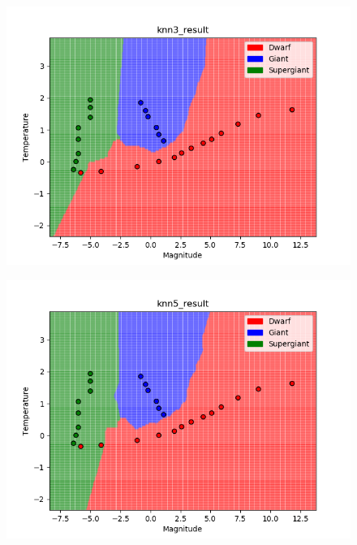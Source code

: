 \documentclass[submit]{harvardml}
\begin{document}
\begin{enumerate}
\begin{figure} [h!]
        \includegraphics[height=0.4\textheight]{HW2/knn3_result.png}
    \end{figure}
    \begin{figure} [h!]
        \centering
        \includegraphics[height=0.4\textheight]{HW2/knn5_result.png}
    \end{figure}
    \newpage
    \newpage
    \newpage \\ \\ \\ \\ 
    

\end{enumerate}
\end{document}
